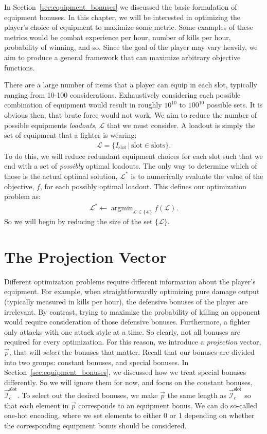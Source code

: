 In Section~\ref{sec:equipment_bonuses} we discussed the basic formulation of equipment bonuses. In this chapter, we will be interested in optimizing the player's choice of equipment to maximize some metric. Some examples of these metrics would be combat experience per hour, number of kills per hour, probability of winning, and so. Since the goal of the player may vary heavily, we aim to produce a general framework that can maximize arbitrary objective functions.

There are a large number of items that a player can equip in each slot, typically ranging from 10-100 considerations. Exhaustively considering each possible combination of equipment would result in roughly $10^{10}$ to $100^{10}$ possible sets. It is obvious then, that brute force would not work. We aim to reduce the number of possible equipments \textit{loadouts}, $\mathcal{L}$ that we must consider. A loadout is simply the set of equipment that a fighter is wearing:
\begin{align}
	\mathcal{L} = \{I_\text{slot}\,|\,\text{slot} \in \text{slots}\}.
\end{align}
To do this, we will reduce redundant equipment choices for each slot such that we end with a set of \emph{possibly} optimal loadouts. The only way to determine which of those is the actual optimal solution, $\mathcal{L}^*$ is to numerically evaluate the value of the objective, $f$, for each possibly optimal loadout. This defines our optimization problem as:
\begin{align}
	\mathcal{L}^* \leftarrow \mathop{\mathrm{argmin}}_{\mathcal{L} \in \{\mathcal{L}\}} f(\mathcal{L}).
\end{align}
So we will begin by reducing the size of the set $\{\mathcal{L}\}$.

\section{The Projection Vector}
	Different optimization problems require different information about the player's equipment. For example, when straightforwardly optimizing pure damage output (typically measured in kills per hour), the defensive bonuses of the player are irrelevant. By contrast, trying to maximize the probability of killing an opponent would require consideration of those defensive bonuses. Furthermore, a fighter only attacks with one attack style at a time. So clearly, not all bonuses are required for every optimization. For this reason, we introduce a \textit{projection} vector, $\vec{p}$, that will \emph{select} the bonuses that matter. Recall that our bonuses are divided into two groups: constant bonuses, and special bonuses. In Section~\ref{sec:equipment_bonuses}, we discussed how we treat special bonuses differently. So we will ignore them for now, and focus on the constant bonuses, $\vec{\mathcal{I}}_c^\text{slot}$. To select out the desired bonuses, we make $\vec{p}$ the same length as $\vec{\mathcal{I}}_c^\text{slot}$ so that each element in $\vec{p}$ corresponds to an equipment bonus. We can do so-called one-hot encoding, where we set elements to either 0 or 1 depending on whether the corresponding equipment bonus should be considered.

